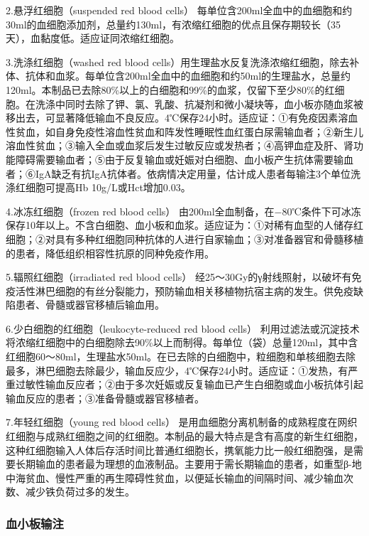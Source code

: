 2.悬浮红细胞（suspended red blood cells）
每单位含200ml全血中的血细胞和约30ml的血细胞添加剂，总量约130ml，有浓缩红细胞的优点且保存期较长（35天），血黏度低。适应证同浓缩红细胞。

3.洗涤红细胞（washed red blood
cells）用生理盐水反复洗涤浓缩红细胞，除去补体、抗体和血浆。每单位含200ml全血中的血细胞和约50ml的生理盐水，总量约120ml。本制品已去除80\%以上的白细胞和99\%的血浆，仅留下至少80\%的红细胞。在洗涤中同时去除了钾、氯、乳酸、抗凝剂和微小凝块等，血小板亦随血浆被移出去，可显著降低输血不良反应。4℃保存24小时。适应证：①有免疫因素溶血性贫血，如自身免疫性溶血性贫血和阵发性睡眠性血红蛋白尿需输血者；②新生儿溶血性贫血；③输入全血或血浆后发生过敏反应或发热者；④高钾血症及肝、肾功能障碍需要输血者；⑤由于反复输血或妊娠对白细胞、血小板产生抗体需要输血者；⑥IgA缺乏有抗IgA抗体者。依病情决定用量，估计成人患者每输注3个单位洗涤红细胞可提高Hb
10g/L或Hct增加0.03。

4.冰冻红细胞（frozen red blood cells）
由200ml全血制备，在−80℃条件下可冰冻保存10年以上。不含白细胞、血小板和血浆。适应证为：①对稀有血型的人储存红细胞；②对具有多种红细胞同种抗体的人进行自家输血；③对准备器官和骨髓移植的患者，降低组织相容性抗原的同种免疫作用。

5.辐照红细胞（irradiated red blood cells）
经25～30Gy的γ射线照射，以破坏有免疫活性淋巴细胞的有丝分裂能力，预防输血相关移植物抗宿主病的发生。供免疫缺陷患者、骨髓或器官移植后输血用。

6.少白细胞的红细胞（leukocyte-reduced red blood cells）
利用过滤法或沉淀技术将浓缩红细胞中的白细胞除去90\%以上而制得。每单位（袋）总量120ml，其中含红细胞60～80ml，生理盐水50ml。在已去除的白细胞中，粒细胞和单核细胞去除最多，淋巴细胞去除最少，输血反应少，4℃保存24小时。适应证：①发热，有严重过敏性输血反应者；②由于多次妊娠或反复输血已产生白细胞或血小板抗体引起输血反应的患者；③准备骨髓或器官移植者。

7.年轻红细胞（young red blood cells）
是用血细胞分离机制备的成熟程度在网织红细胞与成熟红细胞之间的红细胞。本制品的最大特点是含有高度的新生红细胞，这种红细胞输入人体后存活时间比普通红细胞长，携氧能力比一般红细胞强，是需要长期输血的患者最为理想的血液制品。主要用于需长期输血的患者，如重型β-地中海贫血、慢性严重的再生障碍性贫血，以便延长输血的间隔时间、减少输血次数、减少铁负荷过多的发生。

\subsubsection{血小板输注}

